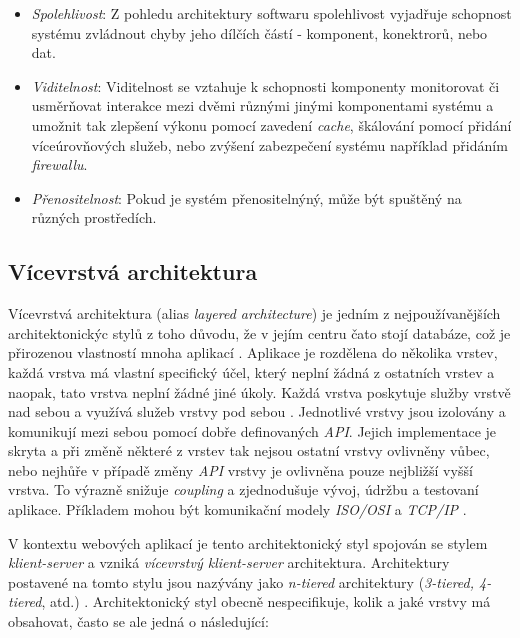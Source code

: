 \begin{itemize}
  \item{\textit{Spolehlivost}}: Z pohledu architektury softwaru spolehlivost vyjadřuje schopnost systému zvládnout chyby jeho dílčích částí - komponent, konektrorů, nebo dat.
  \item{\textit{Viditelnost}}: Viditelnost se vztahuje k schopnosti komponenty monitorovat či usměrňovat interakce mezi dvěmi různými jinými komponentami systému a umožnit tak zlepšení výkonu pomocí zavedení \textit{cache}, škálování pomocí přidání víceúrovňových služeb, nebo zvýšení zabezpečení systému například přidáním \textit{firewallu}.
  \item{\textit{Přenositelnost}}: Pokud je systém přenositelnýný, může být spuštěný na různých prostředích.
\end{itemize}

\subsection{Vícevrstvá architektura}
\label{sec:n-tier}
Vícevrstvá architektura (alias \textit{layered architecture}) je jedním z nejpoužívanějších architektonickýc stylů z toho důvodu, že v jejím centru čato stojí databáze, což je přirozenou vlastností mnoha aplikací \cite{Richards15}. Aplikace je rozdělena do několika vrstev, každá vrstva má vlastní specifický účel, který neplní žádná z ostatních vrstev a naopak, tato vrstva neplní žádné jiné úkoly. Každá vrstva poskytuje služby vrstvě nad sebou a využívá služeb vrstvy pod sebou \cite{Garlan94}. Jednotlivé vrstvy jsou izolovány a komunikují mezi sebou pomocí dobře definovaných \textit{API}. Jejich implementace je skryta a při změně některé z vrstev tak nejsou ostatní vrstvy ovlivněny vůbec, nebo nejhůře v případě změny \textit{API} vrstvy je ovlivněna pouze nejbližší vyšší vrstva. To výrazně snižuje \textit{coupling} a zjednodušuje vývoj, údržbu a testovaní aplikace. Příkladem mohou být komunikační modely \textit{ISO/OSI} a \textit{TCP/IP} \cite{Zimmerman80}.

V kontextu webových aplikací je tento architektonický styl spojován se stylem \textit{klient-server} a vzniká \textit{vícevrstvý klient-server} architektura. Architektury postavené na tomto stylu jsou nazývány jako \textit{n-tiered} architektury (\textit{3-tiered, 4-tiered}, atd.) \cite{Umar97}. Architektonický styl obecně nespecifikuje, kolik a jaké vrstvy má obsahovat, často se ale jedná o následující:

